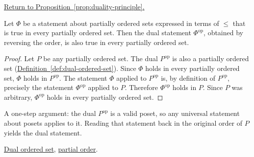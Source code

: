 
\newpage
{}
\label{prf:duality-principle}

\begin{remark*}[Return]
\hyperref[prop:duality-principle]{Return to Proposition~\ref*{prop:duality-principle}.}
\end{remark*}

\begin{theorem*}
Let $\Phi$ be a statement about partially ordered sets expressed in terms
of $\leq$ that is true in every partially ordered set.  Then the dual
statement $\Phi^{\mathrm{op}}$, obtained by reversing the order, is also
true in every partially ordered set.
\end{theorem*}

\begin{proof}[Proof]
Let $P$ be any partially ordered set.  The dual $P^{\mathrm{op}}$ is
also a partially ordered set
(\hyperref[def:dual-ordered-set]{Definition~\ref*{def:dual-ordered-set}}).
Since $\Phi$ holds in every partially ordered set, $\Phi$ holds in
$P^{\mathrm{op}}$.  The statement $\Phi$ applied to $P^{\mathrm{op}}$ is,
by definition of $P^{\mathrm{op}}$, precisely the statement $\Phi^{\mathrm{op}}$
applied to $P$.  Therefore $\Phi^{\mathrm{op}}$ holds in $P$.  Since $P$
was arbitrary, $\Phi^{\mathrm{op}}$ holds in every partially ordered set.
\end{proof}

\begin{remark*}
A one-step argument: the dual $P^{\mathrm{op}}$ is a valid poset, so
any universal statement about posets applies to it.  Reading that
statement back in the original order of $P$ yields the dual statement.
\end{remark*}

\begin{remark*}[Dependencies]
\hyperref[def:dual-ordered-set]{Dual ordered set},
\hyperref[def:partial-order]{partial order}.
\end{remark*}
